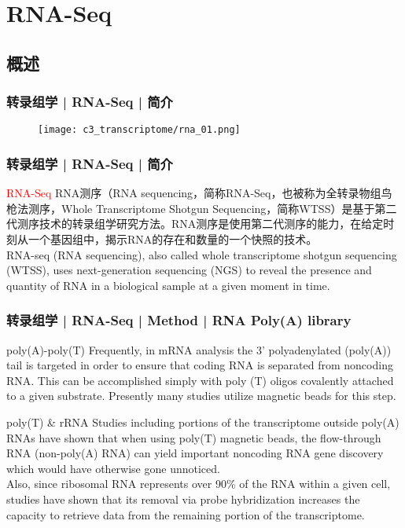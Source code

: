 \section{RNA-Seq}
\subsection{概述}
\begin{frame}
  \frametitle{转录组学 | RNA-Seq | 简介}
  \begin{figure}
    \centering
    \texttt{[image: c3\_transcriptome/rna\_01.png]}
  \end{figure}
\end{frame}

\begin{frame}
  \frametitle{转录组学 | RNA-Seq | 简介}
  \begin{block}{\textcolor{red}{RNA-Seq}}
 RNA测序（RNA sequencing，简称RNA-Seq，也被称为全转录物组鸟枪法测序，Whole Transcriptome Shotgun Sequencing，简称WTSS）是基于第二代测序技术的转录组学研究方法。RNA测序是使用第二代测序的能力，在给定时刻从一个基因组中，揭示RNA的存在和数量的一个快照的技术。\\
 \vspace{1em}
RNA-seq (RNA sequencing), also called whole transcriptome shotgun sequencing (WTSS), uses next-generation sequencing (NGS) to reveal the presence and quantity of RNA in a biological sample at a given moment in time.
  \end{block}
\end{frame}

\begin{frame}
  \frametitle{转录组学 | RNA-Seq | Method | RNA Poly(A) library}
  \begin{block}{poly(A)-poly(T)}
    Frequently, in mRNA analysis the 3' polyadenylated (poly(A)) tail is targeted in order to ensure that coding RNA is separated from noncoding RNA. This can be accomplished simply with poly (T) oligos covalently attached to a given substrate. Presently many studies utilize magnetic beads for this step.
  \end{block}
  \pause
  \begin{block}{poly(T) \& rRNA}
    Studies including portions of the transcriptome outside poly(A) RNAs have shown that when using poly(T) magnetic beads, the flow-through RNA (non-poly(A) RNA) can yield important noncoding RNA gene discovery which would have otherwise gone unnoticed.\\
    \vspace{0.2em}
    Also, since ribosomal RNA represents over 90\% of the RNA within a given cell, studies have shown that its removal via probe hybridization increases the capacity to retrieve data from the remaining portion of the transcriptome.
  \end{block}
\end{frame}

